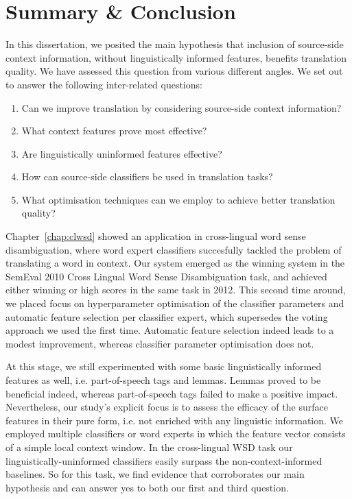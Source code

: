 \chapter{Summary \& Conclusion}
\label{chap:conclusion}

In this dissertation, we posited the main hypothesis that inclusion of source-side context information, without
linguistically informed features, benefits translation quality. We have
assessed this question from various different angles. We set out to answer
the following inter-related questions:

\begin{enumerate}
\item Can we improve translation by considering source-side context information? 
\item What context features prove most effective?
\item Are linguistically uninformed features effective?
\item How can source-side classifiers be used in translation tasks?
\item What optimisation techniques can we employ to achieve better translation quality?
\end{enumerate}

Chapter~\ref{chap:clwsd} showed an application in cross-lingual word sense
disambiguation, where word expert classifiers succesfully tackled the problem
of translating a word in context. Our system emerged as the winning system in
the SemEval 2010 Cross Lingual Word Sense Disambiguation task, and achieved
either winning or high scores in the same task in 2012. This second time
around, we placed focus on hyperparameter optimisation of the classifier
parameters and automatic feature selection per classifier expert, which
supersedes the voting approach we used the first time. Automatic feature
selection indeed leads to a modest improvement, whereas classifier parameter
optimisation does not.

At this stage, we still experimented with some basic linguistically informed
features as well, i.e. part-of-speech tags and lemmas. Lemmas proved to be
beneficial indeed, whereas part-of-speech tags failed to make a positive
impact. Nevertheless, our study's explicit focus is to assess the efficacy of
the surface features in their pure form, i.e. not enriched with any linguistic
information. We employed multiple classifiers or word experts in which the
feature vector consists of a simple local context window. In the cross-lingual
WSD task our linguistically-uninformed classifiers easily surpass the
non-context-informed baselines. So for this task, we find evidence that
corroborates our main hypothesis and can answer yes to both our first and third
question.

